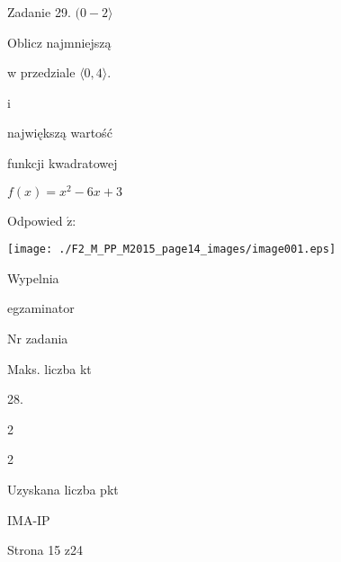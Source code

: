 \documentclass[a4paper,12pt]{article}
\begin{document}
Zadanie 29. $(0-2\rangle$

Oblicz najmniejszą

w przedziale $\langle 0, 4\rangle.$

i

największą wartość

funkcji kwadratowej

$f(x)=x^{2}-6x+3$

Odpowied $\acute{\mathrm{z}}$:
\begin{center}
\texttt{[image: ./F2\_M\_PP\_M2015\_page14\_images/image001.eps]}
\end{center}
Wypelnia

egzaminator

Nr zadania

Maks. liczba kt

28.

2

2

Uzyskana liczba pkt

IMA-IP

Strona 15 z24
\end{document}
